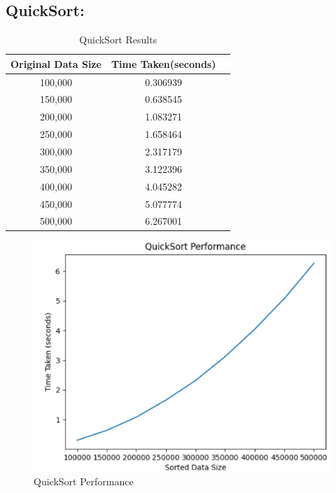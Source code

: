 \documentclass[a4paper, 9pt, twocolumn]{article}
\begin{document}
\subsection*{QuickSort:}
\vspace{-6mm}
\begin{table}[!hbt]
	\centering
	\label{tab:quick_sort_table}
	\vspace{2mm}
	\begin{tabular}{|c|c|c|}
		\hline
		\textbf{Original Data Size} & \textbf{Time Taken(seconds)} \\
		\hline
		100,000                     & 0.306939                     \\
		150,000                     & 0.638545                     \\
		200,000                     & 1.083271                     \\
		250,000                     & 1.658464                     \\
		300,000                     & 2.317179                     \\
		350,000                     & 3.122396                     \\
		400,000                     & 4.045282                     \\
		450,000                     & 5.077774                     \\
		500,000                     & 6.267001                     \\
		\hline
	\end{tabular}
	\caption{QuickSort Results}
\end{table}
\vspace{-6mm}
\begin{figure}[!hbt]
	\centering
	\includegraphics[width=0.8\linewidth]{quick_sort.png}  %
	\caption{QuickSort Performance}
	\label{fig:quick_sort}
\end{figure}
\vspace{-6mm}
\end{document}
